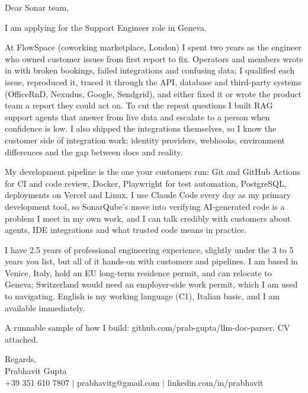 \documentclass[a4paper,11pt]{article}
\begin{document}
Dear Sonar team,

I am applying for the Support Engineer role in Geneva.

At FlowSpace (coworking marketplace, London) I spent two years as the engineer who owned customer issues from first report to fix. Operators and members wrote in with broken bookings, failed integrations and confusing data; I qualified each issue, reproduced it, traced it through the API, database and third-party systems (OfficeRnD, Nexudus, Google, Sendgrid), and either fixed it or wrote the product team a report they could act on. To cut the repeat questions I built RAG support agents that answer from live data and escalate to a person when confidence is low. I also shipped the integrations themselves, so I know the customer side of integration work: identity providers, webhooks, environment differences and the gap between docs and reality.

My development pipeline is the one your customers run: Git and GitHub Actions for CI and code review, Docker, Playwright for test automation, PostgreSQL, deployments on Vercel and Linux. I use Claude Code every day as my primary development tool, so SonarQube's move into verifying AI-generated code is a problem I meet in my own work, and I can talk credibly with customers about agents, IDE integrations and what trusted code means in practice.

I have 2.5 years of professional engineering experience, slightly under the 3 to 5 years you list, but all of it hands-on with customers and pipelines. I am based in Venice, Italy, hold an EU long-term residence permit, and can relocate to Geneva; Switzerland would need an employer-side work permit, which I am used to navigating. English is my working language (C1), Italian basic, and I am available immediately.

A runnable sample of how I build: github.com/prab-gupta/llm-doc-parser. CV attached.

Regards,\\
Prabhavit Gupta\\
+39 351 610 7807 $\vert$ prabhavitg@gmail.com $\vert$ linkedin.com/in/prabhavit
\end{document}
